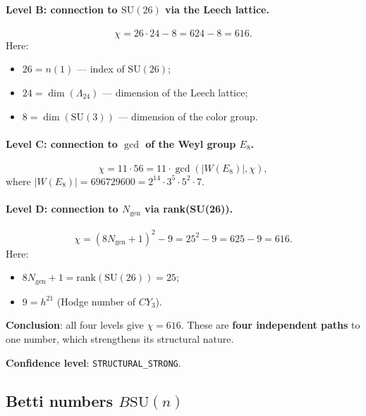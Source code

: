 \documentclass[11pt,a4paper]{article}
\newcommand{\SU}{\ensuremath{\mathrm{SU}}}
\newcommand{\CY}{\ensuremath{CY_3}}
\newcommand{\Ngen}{\ensuremath{N_{\text{gen}}}}
\newcommand{\BSU}{\ensuremath{B\mathrm{SU}}}
\theoremstyle{definition}
\begin{document}
\paragraph{Level B: connection to \texorpdfstring{$\SU(26)$}{(26)} via the Leech lattice.}
\begin{equation}
    \chi = 26 \cdot 24 - 8 = 624 - 8 = 616.
\end{equation}
Here:
\begin{itemize}
    \item $26 = n(1)$ --- index of $\SU(26)$;
    \item $24 = \dim(\Lambda_{24})$ --- dimension of the Leech lattice;
    \item $8 = \dim(\SU(3))$ --- dimension of the color group.
\end{itemize}

\paragraph{Level C: connection to \texorpdfstring{$\gcd$}{} of the Weyl group \texorpdfstring{$E_8$}{E_8}.}
\begin{equation}
    \chi = 11 \cdot 56 = 11 \cdot \gcd(|W(E_8)|, \chi),
\end{equation}
where $|W(E_8)| = 696729600 = 2^{14} \cdot 3^5 \cdot 5^2 \cdot 7$.

\paragraph{Level D: connection to $N_{\text{gen}}$ via rank(SU(26)).}
\begin{equation}
    \chi = (8 \Ngen + 1)^2 - 9 = 25^2 - 9 = 625 - 9 = 616.
\end{equation}
Here:
\begin{itemize}
    \item $8 \Ngen + 1 = \text{rank}(\SU(26)) = 25$;
    \item $9 = h^{21}$ (Hodge number of $\CY$).
\end{itemize}

\medskip\noindent
\textbf{Conclusion}: all four levels give $\chi = 616$. These are
\textbf{four independent paths} to one number, which strengthens
its structural nature.

\medskip\noindent
\textbf{Confidence level}: \texttt{STRUCTURAL\_STRONG}.

\subsection{Betti numbers \texorpdfstring{$\BSU(n)$}{B SU(n)}}
\label{subsec:betti}
\end{document}
